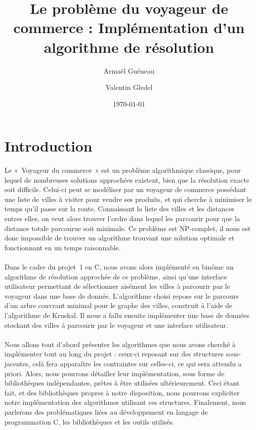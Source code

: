 \documentclass[a4paper]{article}
\title{Le problème du voyageur de commerce : Implémentation d'un algorithme de résolution}
\author{Armaël {\sc Guéneau} \and Valentin {\sc Gledel}}
\date{\today}
\begin{document}
\maketitle

\tableofcontents

\newpage

\section*{Introduction}

\paragraph*{}
Le «~Voyageur du commerce~» est un problème algorithmique classique, pour lequel de nombreuses solutions approchées existent, bien que la résolution exacte soit difficile. Celui-ci peut se modéliser par un voyageur de commerce possédant une liste de villes à visiter pour vendre ses produits, et qui cherche à minimiser le temps qu’il passe sur la route. Connaissant la liste des villes et les distances entres elles, on veut alors trouver l’ordre dans lequel les parcourir pour que la distance totale parcourue soit minimale. Ce problème est NP-complet, il nous est donc impossible de trouver un algorithme trouvant une solution optimale et fonctionnant en un temps raisonnable.
\paragraph*{}
Dans le cadre du projet~1 en C, nous avons alors implémenté en binôme un algorithme de résolution approchée de ce problème, ainsi qu’une interface utilisateur permettant de sélectionner aisément les villes à parcourir par le voyageur dans une base de donnée.
L’algorithme choisi repose sur le parcours d'un arbre couvrant minimal pour le graphe des villes, construit à l'aide de l'algorithme de {\sc Kruskal}. Il nous a fallu ensuite implémenter une base de données stockant des villes à parcourir par le voyageur et une interface utilisateur.
\paragraph*{}
Nous allons tout d’abord présenter les algorithmes que nous avons cherché à implémenter tout au long du projet : ceux-ci reposant sur des structures sous-jacentes, celà fera apparaître les contraintes sur celles-ci, ce qui sera attendu a priori. Alors, nous pourrons détailler leur implémentation, sous forme de bibliothèques indépendantes, prêtes à être utilisées ultérieurement. Ceci étant fait, et des bibliothèques propres à notre disposition, nous pourrons expliciter notre implémentation des algorithmes utilisant ces structures. Finalement, nous parlerons des problématiques liées au développement en langage de programmation C, les bibliothèques et les outils utilisés.
\end{document}
